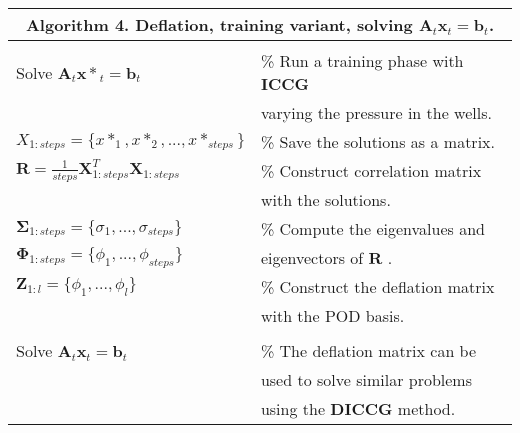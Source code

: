 \documentclass[12pt]{article}
\begin{document}
\begin{minipage}{12cm}
\begin{tabular}{ |l l| } 
\hline
\multicolumn{2}{|c|}{\textbf{Algorithm 4.} Deflation, training variant, solving $\mathbf{A}_t\mathbf{x}_t=\mathbf{b}_t$.}\\
\hline
 \hline
&\\

\hspace{0.5cm}Solve $\mathbf{A}_t\mathbf{x*}_t=\mathbf{b}_t$  &\footnotesize\% Run a training phase with \textbf{ICCG} \\ &\hspace{0.5cm}\footnotesize varying the pressure in the wells. \\
\hspace{0.5cm}$X_{1:steps}=\{x*_1,x*_2,...,x*_{steps}\}$&\footnotesize \%  Save the solutions as a matrix. \\
 \hspace{1cm}$\mathbf{R}= \frac{1}{steps} \mathbf{X}_{1:steps}^T\mathbf{X}_{1:steps}$&\footnotesize \% Construct correlation matrix \\&\hspace{0.5cm}\footnotesize with the solutions. \\
  \hspace{1cm}$\mathbf{\Sigma}_{1:steps}= \{\sigma_{1}, ... ,\sigma_{steps}\}$& \footnotesize \% Compute the eigenvalues  and \\
  \hspace{1cm}$\mathbf{\Phi}_{1:steps}= \{\phi_{1}, ... ,\phi_{steps}\}$ &\hspace{0.5cm}\footnotesize eigenvectors of $\mathbf{R}$ . \\
  \hspace{1cm}$\mathbf{Z}_{1:l}=\{\phi_{1}, ... ,\phi_{l}\}$& \footnotesize \% Construct the deflation matrix  \\
   &\hspace{0.5cm}\footnotesize with the POD basis. \\ &\\
   
   
  \hspace{1cm}Solve $\mathbf{A}_t\mathbf{x}_t=\mathbf{b}_t$& \footnotesize \%  The deflation matrix can be \\
  & \hspace{0.5cm}\footnotesize used to solve similar problems \\ 
    & \hspace{0.5cm}\footnotesize  using the \textbf{DICCG} method. \\ 

\hline
\end{tabular}
\end{minipage}\par \vspace{0.5cm}
\end{document}
